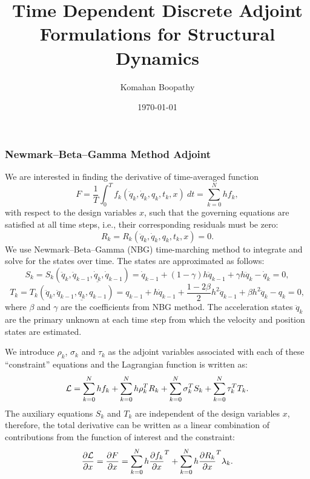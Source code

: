 \documentclass{beamer}
\title[\hspace{-0.2cm} Time Dependent Discrete Adjoint]
{
Time Dependent Discrete Adjoint Formulations for Structural Dynamics
}
\author[Komahan Boopathy]
{
  \Large {Komahan Boopathy}\\
}
\institute
{
  \large Georgia Institute of Technology\\
 School of Aerospace Engineering\\
 Atlanta, GA
}
\date
{
\small \today
}
\newcommand{\pd}[2]{\frac{\partial #1}{\partial #2}}
\begin{document}
\begin{frame}
  \titlepage
\end{frame}


\begin{frame}[allowframebreaks] \frametitle{Newmark--Beta--Gamma Method Adjoint}

  \tiny{We are interested in finding the derivative of time-averaged
    function 
    \begin{equation}\label{eqn:time-averaged-function}
      F = \frac{1}{T}\int_{0}^T f_k(\ddot{q}_k, \dot{q}_k,
      q_k, t_k , x)~dt=\sum_{k=0}^N h f_k,
    \end{equation} 
with respect to the design variables $x$, such that the governing
equations are satisfied at all time steps, i.e., their corresponding
residuals must be zero:
\begin{equation}\label{eqn:nbg-residual}
  R_k=R_k(\ddot{q}_k, \dot{q}_k, q_k, t_k , x) = 0.
\end{equation}
 We use Newmark--Beta--Gamma (NBG) time-marching method to integrate
 and solve for the states over time. The states are approximated as
 follows:
\begin{equation}\label{eqn:nbg-approx-qdot}
     S_k = S_k(\ddot{q}_{k}, \ddot{q}_{k-1}, \underline{\dot{q}_k}, \dot{q}_{k-1}) =  \dot{q}_{k-1}  + (1-\gamma) h \ddot{q}_{k-1} +  \gamma h \ddot{q}_{k}- \dot{q}_k=0, 
\end{equation}
\begin{equation}\label{eqn:nbg-approx-q}
     T_k = T_k(\ddot{q}_{k}, \ddot{q}_{k-1}, \underline{{q}_k}, {q}_{k-1}) = {q}_{k-1} + h \dot{q}_{k-1} +\frac{1-2\beta}{2}
    h^2\ddot{q}_{k-1} + \beta h^2 \ddot{q}_k-{q}_k=0, 
\end{equation}
where $\beta$ and $\gamma$ are the coefficients from NBG method. The
acceleration states $\ddot{q}_k$ are the primary unknown at each time
step from which the velocity and position states are estimated.

    \framebreak

    We introduce $\rho_k$, $\sigma_k$ and $\tau_k$ as the adjoint
    variables associated with each of these ``constraint'' equations
    and the Lagrangian function is written as:
    \begin{equation}\label{eqn:nbg-lagrangian}
      {\cal{L}} = \sum_{k=0}^N h f_k+ \sum_{k=0}^N h \rho_k^T R_k + \sum_{k=0}^N \sigma_k^T S_k + \sum_{k=0}^N \tau_k^T T_k.
    \end{equation} 
    The auxiliary equations $S_k$ and $T_k$ are independent of the
    design variables $x$, therefore, the total derivative can be
    written as a linear combination of contributions from the function
    of interest and the constraint:
    \begin{equation}\label{eqn:nbg-total-derivative}
      \pd{\cal{L}}{x} = \pd{F}{x} = \sum_{k=0}^N h \pd{f_k}{x}^T + \sum_{k=0}^N h
    \pd{R_k}{x}^T \lambda_k.
    \end{equation}

}
\end{frame}
\end{document}
